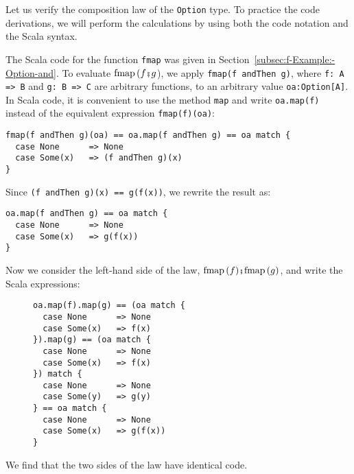 Let us verify the composition law of the \lstinline!Option! type.
To practice the code derivations, we will perform the calculations
by using both the code notation and the Scala syntax.

The Scala code for the function \lstinline!fmap! was given in Section~\ref{subsec:f-Example:-Option-and}.
To evaluate $\text{fmap}\,(f\bef g$), we apply \lstinline!fmap(f andThen g)!,
where \lstinline!f: A => B! and \lstinline!g: B => C! are arbitrary
functions, to an arbitrary value \lstinline!oa:Option[A]!. In Scala
code, it is convenient to use the  method \lstinline!map! and write
\lstinline!oa.map(f)! instead of the equivalent expression \lstinline!fmap(f)(oa)!:
\begin{lstlisting}
fmap(f andThen g)(oa) == oa.map(f andThen g) == oa match {
  case None      => None
  case Some(x)   => (f andThen g)(x)
}
\end{lstlisting}
Since \lstinline!(f andThen g)(x) == g(f(x))!, we rewrite the result
as:
\begin{lstlisting}
oa.map(f andThen g) == oa match {
  case None      => None
  case Some(x)   => g(f(x))
}
\end{lstlisting}
Now we consider the left-hand side of the law, $\text{fmap}\,(f)\bef\text{fmap}\,(g)$,
and write the Scala expressions:

\begin{wrapfigure}{l}{0.33\columnwidth}%
\vspace{-0.8\baselineskip}
\begin{lstlisting}
oa.map(f).map(g) == (oa match {
  case None      => None
  case Some(x)   => f(x)
}).map(g) == (oa match {
  case None      => None
  case Some(x)   => f(x)
}) match {
  case None      => None
  case Some(y)   => g(y)
} == oa match {
  case None      => None
  case Some(x)   => g(f(x))
}
\end{lstlisting}
\vspace{-5\baselineskip}
\end{wrapfigure}%

\noindent We find that the two sides of the law have identical code.

